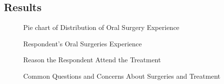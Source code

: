 \documentclass[12pt,oneside,openright,a4paper]{cpe-english-project}
\begin{document}
    \subsection{Results}
      \begin{figure}[!h]
        \centering
        \caption{Pie chart of Distribution of Oral Surgery Experience}\label{fig:Result_1}
      \end{figure}
      \begin{figure}[!h]
        \centering
        \caption{Respondent’s Oral Surgeries Experience}\label{fig:Result_2}
      \end{figure}
      \begin{figure}[!h]
        \centering
        \caption{Reason the Respondent Attend the Treatment}\label{fig:Result_3}
      \end{figure}
      \begin{figure}[!h]
        \centering
        \caption{Common Questions and Concerns About Surgeries and Treatment}\label{fig:Result_4}
      \end{figure}
\end{document}
